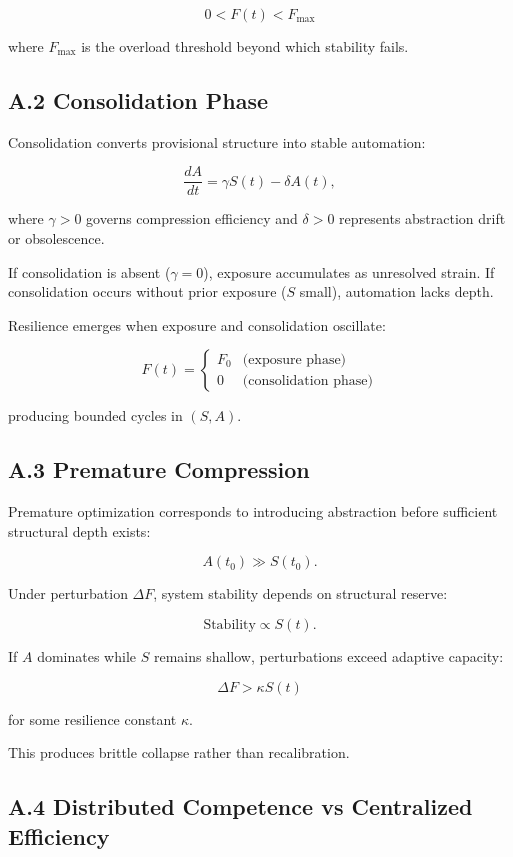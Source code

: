 \documentclass[12pt]{article}
\begin{document}
\[
0 < F(t) < F_{\max}
\]

where $F_{\max}$ is the overload threshold beyond which stability fails.

\subsection*{A.2 Consolidation Phase}

Consolidation converts provisional structure into stable automation:

\[
\frac{dA}{dt} = \gamma S(t) - \delta A(t),
\]

where $\gamma > 0$ governs compression efficiency and
$\delta > 0$ represents abstraction drift or obsolescence.

If consolidation is absent ($\gamma = 0$), exposure accumulates as unresolved strain.
If consolidation occurs without prior exposure ($S$ small), automation lacks depth.

Resilience emerges when exposure and consolidation oscillate:

\[
F(t) = 
\begin{cases}
F_0 & \text{(exposure phase)} \\
0   & \text{(consolidation phase)}
\end{cases}
\]

producing bounded cycles in $(S,A)$.

\subsection*{A.3 Premature Compression}

Premature optimization corresponds to introducing abstraction before sufficient structural depth exists:

\[
A(t_0) \gg S(t_0).
\]

Under perturbation $\Delta F$, system stability depends on structural reserve:

\[
\text{Stability} \propto S(t).
\]

If $A$ dominates while $S$ remains shallow, perturbations exceed adaptive capacity:

\[
\Delta F > \kappa S(t)
\]

for some resilience constant $\kappa$.

This produces brittle collapse rather than recalibration.

\subsection*{A.4 Distributed Competence vs Centralized Efficiency}
\end{document}
